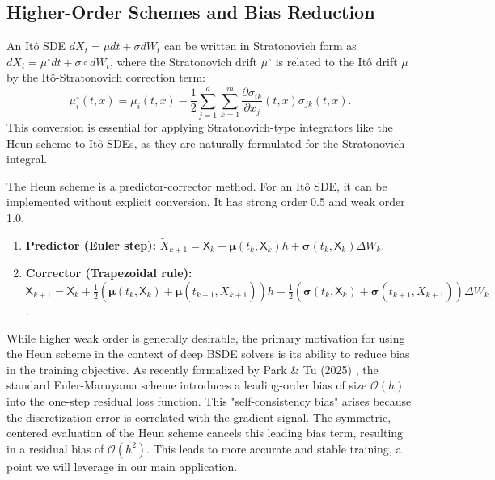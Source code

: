 \subsection{Higher-Order Schemes and Bias Reduction}
\label{sec:higher_order_mlmc}

\begin{proposition}
An Itô SDE $dX_t = \mu dt + \sigma dW_t$ can be written in Stratonovich form as $dX_t = \mu^\circ dt + \sigma \circ dW_t$, where the Stratonovich drift $\mu^\circ$ is related to the Itô drift $\mu$ by the Itô-Stratonovich correction term:
\[
\mu^\circ_i(t,x) = \mu_i(t,x) - \frac{1}{2} \sum_{j=1}^d \sum_{k=1}^m \frac{\partial \sigma_{ik}}{\partial x_j}(t,x) \sigma_{jk}(t,x).
\]
This conversion is essential for applying Stratonovich-type integrators like the Heun scheme to Itô SDEs, as they are naturally formulated for the Stratonovich integral.
\end{proposition}

\begin{definition}
The Heun scheme is a predictor-corrector method. For an Itô SDE, it can be implemented without explicit conversion. It has strong order 0.5 and weak order 1.0.
\begin{enumerate}
    \item \textbf{Predictor (Euler step):} $\tilde{X}_{k+1} = \mathsf{X}_k + \bm{\mu}(t_k, \mathsf{X}_k)h + \bm{\sigma}(t_k, \mathsf{X}_k)\Delta W_k$.
    \item \textbf{Corrector (Trapezoidal rule):} $\mathsf{X}_{k+1} = \mathsf{X}_k + \frac{1}{2}(\bm{\mu}(t_k, \mathsf{X}_k) + \bm{\mu}(t_{k+1}, \tilde{X}_{k+1}))h + \frac{1}{2}(\bm{\sigma}(t_k, \mathsf{X}_k) + \bm{\sigma}(t_{k+1}, \tilde{X}_{k+1}))\Delta W_k$.
\end{enumerate}
\end{definition}

\begin{remark}
While higher weak order is generally desirable, the primary motivation for using the Heun scheme in the context of deep BSDE solvers is its ability to reduce bias in the training objective. As recently formalized by Park \& Tu (2025) \cite{ParkTu2025}, the standard Euler-Maruyama scheme introduces a leading-order bias of size $\mathcal{O}(h)$ into the one-step residual loss function. This "self-consistency bias" arises because the discretization error is correlated with the gradient signal. The symmetric, centered evaluation of the Heun scheme cancels this leading bias term, resulting in a residual bias of $\mathcal{O}(h^2)$. This leads to more accurate and stable training, a point we will leverage in our main application.
\end{remark}

